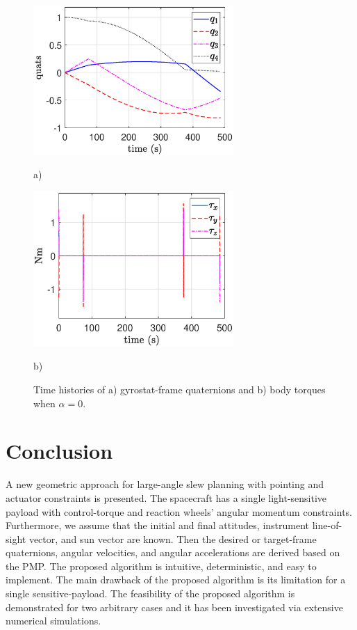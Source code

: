 \documentclass[letterpaper, paper,12pt]{AAS}		%
\begin{document}
\begin{figure}[!htb]
    \centering
    \begin{minipage}{.5\textwidth}
        \centering
\includegraphics[width=3in]{figures/alpha0/quats.eps}
    \caption{a)}
    \end{minipage}%
    \begin{minipage}{0.5\textwidth}
        \centering
\includegraphics[width=3in]{figures/alpha0/torque.eps}
       \caption{b)}
    \end{minipage}
    \caption{Time histories of a) gyrostat-frame quaternions and b) body torques when $\alpha=0$.}
    \label{fig:quats_phi_total0}
	\end{figure}
			
	
			
	\newpage
	\section{Conclusion}
	 A new geometric approach for large-angle slew planning with pointing and actuator constraints is presented. The spacecraft has a single light-sensitive payload with control-torque and reaction wheels' angular momentum constraints. Furthermore, we assume that the initial and final attitudes, instrument line-of-sight vector, and sun vector are known. Then the desired or target-frame quaternions, angular velocities, and angular accelerations are derived based on the PMP.  The proposed algorithm is intuitive, deterministic, and easy to implement. The main drawback of the proposed algorithm is its limitation for a single sensitive-payload. The feasibility of the proposed algorithm is demonstrated for two arbitrary cases and it has been investigated via extensive numerical simulations.
\end{document}
